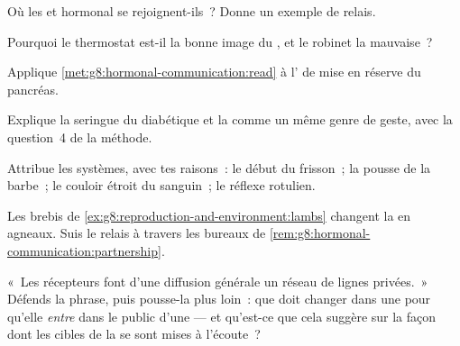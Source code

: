 \begin{exercise}[$\star$]\label{exo:g8:hormonal-communication:6}
Où les  et hormonal se rejoignent-ils~?
Donne un exemple de relais.
\end{exercise}

\begin{exercise}[$\star\star$]\label{exo:g8:hormonal-communication:7}
Pourquoi le thermostat est-il la bonne image du
, et le robinet la mauvaise~?
\end{exercise}

\begin{exercise}[$\star\star$]\label{exo:g8:hormonal-communication:8}
Applique \cref{met:g8:hormonal-communication:read} à
l' de mise en réserve du pancréas.
\end{exercise}

\begin{exercise}[$\star\star$]\label{exo:g8:hormonal-communication:9}
Explique la seringue du diabétique et la  comme un même genre de geste, avec la
question~4 de la méthode.
\end{exercise}

\begin{exercise}[$\star\star$]\label{exo:g8:hormonal-communication:10}
Attribue les systèmes, avec tes raisons~: le début du
frisson~; la pousse de la barbe~; le couloir étroit du
 sanguin~; le réflexe rotulien.
\end{exercise}

\begin{exercise}[$\star\star$]\label{exo:g8:hormonal-communication:11}
Les brebis de \cref{ex:g8:reproduction-and-environment:lambs}
changent la  en agneaux. Suis le relais à travers les
bureaux de
\cref{rem:g8:hormonal-communication:partnership}.
\end{exercise}

\begin{exercise}[$\star\star\star$]\label{exo:g8:hormonal-communication:12}
«~Les récepteurs font d'une diffusion générale un réseau de
lignes privées.~» Défends la phrase, puis pousse-la plus
loin~: que doit changer dans une  pour qu'elle
\emph{entre} dans le public d'une  --- et qu'est-ce
que cela suggère sur la façon dont les cibles de la 
se sont mises à l'écoute~?
\end{exercise}

